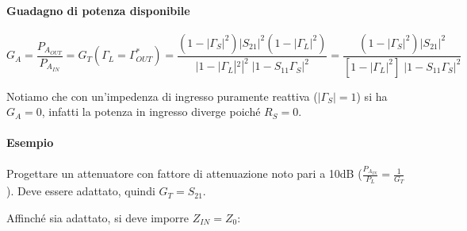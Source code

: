 


\paragraph{Guadagno di potenza disponibile}
\[G_A = \frac{P_{A_{OUT}}}{P_{A_{IN}}} = G_T (\Gamma_L = \Gamma_{OUT}^*) = \frac{(1-|\Gamma_S|^2 )|S_{21}|^2(1-|\Gamma_L|^2)}{| 1-|\Gamma_L|^2 |^2 \; |1- S_{11}\Gamma_S|^2} = \frac{(1-|\Gamma_S|^2 )|S_{21}|^2}{\left[ 1-|\Gamma_L|^2 \right] \; |1- S_{11}\Gamma_S|^2} \]

Notiamo che con un'impedenza di ingresso puramente reattiva ($|\Gamma_S| = 1$) si ha $G_A = 0$, infatti la potenza in ingresso diverge poiché $R_S = 0$.

%	
%	
\paragraph{Esempio} Progettare un attenuatore con fattore di attenuazione noto pari a 10dB ($\frac{P_{A_{IN}}}{P_L} = \frac{1}{G_T}$).
Deve essere adattato, quindi $G_T = S_{21}$.

Affinché sia adattato, si deve imporre $Z_{IN} = Z_0$:

